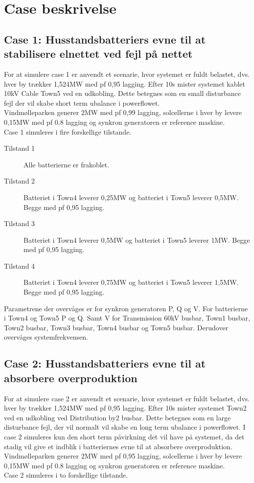 
\label{Simulering}

\section{Case beskrivelse}
\subsection{Case 1: Husstandsbatteriers evne til at stabilisere elnettet ved fejl på nettet}
For at simulere case 1 er anvendt et scenarie, hvor systemet er fuldt belastet, dvs. hver by trækker 1,524MW med pf 0,95 lagging. Efter 10s mister systemet kablet 10kV Cable Town5 ved en udkobling. Dette betegnes som en small disturbance fejl der vil skabe short term ubalance i powerflowet.\\
Vindmølleparken generer 2MW med pf 0,99 lagging, solcellerne i hver by levere 0,15MW med pf 0.8 lagging og synkron generatoren er reference maskine.\\
Case 1 simuleres i fire forskellige tilstande.

\begin{description}
	\item[Tilstand 1] Alle batterierne er frakoblet.
	\item[Tilstand 2] Batteriet i Town4 leverer 0,25MW og batteriet i Town5 leverer 0,5MW. Begge med pf 0,95 lagging.
	\item[Tilstand 3] Batteriet i Town4 leverer 0,5MW og batteriet i Town5 leverer 1MW. Begge med pf 0,95 lagging.
	\item[Tilstand 4] Batteriet i Town4 leverer 0,75MW og batteriet i Town5 leverer 1,5MW. Begge med pf 0,95 lagging.
\end{description}

Parametrene der overvåges er for synkron generatoren P, Q og V.
For batterierne i Town4 og Town5 P og Q. Samt V for Transmission 60kV busbar, Town1 busbar, Town2 busbar, Town3 busbar, Town4 busbar og Town5 busbar.
Derudover overvåges systemfrekvensen.

\subsection{Case 2: Husstandsbatteriers evne til at absorbere overproduktion}
For at simulere case 2 er anvendt et scenarie, hvor systemet er fuldt belastet, dvs. hver by trækker 1,524MW med pf 0,95 lagging. Efter 10s mister systemet Town2 ved en udkobling ved Distribution by2 busbar. Dette betegnes som en large disturbance fejl, der vil normalt vil skabe en long term ubalance i powerflowet. I case 2 simuleres kun den short term påvirkning det vil have på systemet, da det stadig vil give et indblik i batteriernes evne til at absorbere overproduktion.\\
Vindmølleparken generer 2MW med pf 0,95 lagging, solcellerne i hver by levere 0,15MW med pf 0.8 lagging og synkron generatoren er reference maskine.\\
Case 2 simuleres i to forskellige tilstande.

